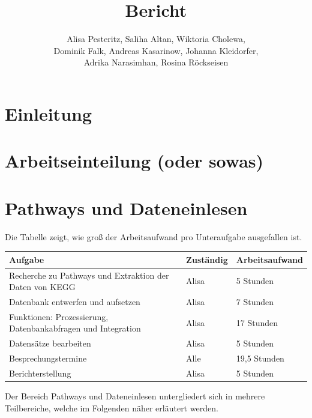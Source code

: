 \documentclass[12pt]{article}
\title{Bericht}
\author{Alisa Pesteritz, Saliha Altan, Wiktoria Cholewa, \\ 
	Dominik Falk, Andreas Kasarinow, Johanna Kleidorfer, \\
	Adrika Narasimhan, Rosina Röckseisen}
\begin{document}
\newpage
\maketitle

\newpage
\pagestyle{fancy}
\fancyhead{}
\section{Einleitung}
\label{einleitung}

\section{Arbeitseinteilung (oder sowas)}
\label{arbeitseinteilung}

\newpage
\pagestyle{fancy}
\fancyhead{}
\section{Pathways und Dateneinlesen}
\label{pathways}

Die Tabelle zeigt, wie groß der Arbeitsaufwand pro Unteraufgabe ausgefallen ist.
\begin{table}[h!]
	\centering
	\begin{tabular}{p{8cm}|l|l}
		Aufgabe & Zuständig & Arbeitsaufwand \\ 
		\hline
		Recherche zu Pathways und Extraktion der Daten von KEGG & Alisa & 5 Stunden \\
		Datenbank entwerfen und aufsetzen & Alisa & 7 Stunden \\ 
		Funktionen: Prozessierung, Datenbankabfragen und Integration & Alisa & 17 Stunden \\ 
		Datensätze bearbeiten & Alisa & 5 Stunden \\          
		Besprechungstermine & Alle & 19,5 Stunden \\    
		Berichterstellung & Alisa & 5 Stunden \\    
	\end{tabular}
\end{table}

\noindent Der Bereich Pathways und Dateneinlesen untergliedert sich in mehrere Teilbereiche, welche im Folgenden näher erläutert werden.
\end{document}
